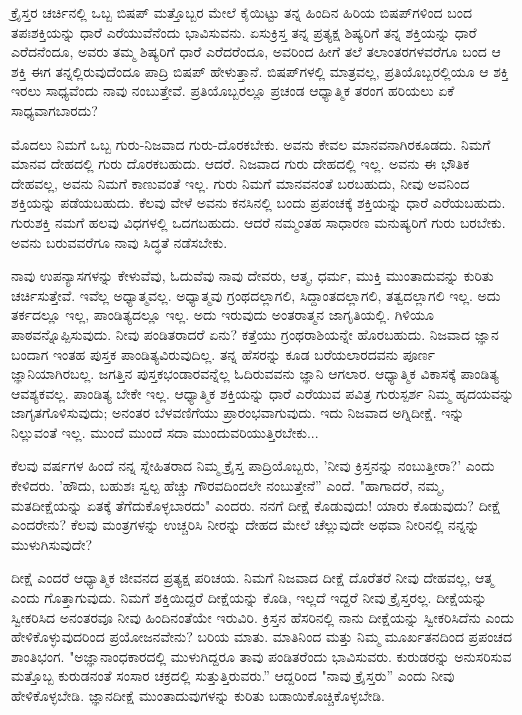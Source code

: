  ಕ್ರೈಸ್ತರ ಚರ್ಚಿನಲ್ಲಿ ಒಬ್ಬ ಬಿಷಪ್ ಮತ್ತೊಬ್ಬರ ಮೇಲೆ ಕೈಯಿಟ್ಟು ತನ್ನ ಹಿಂದಿನ ಹಿರಿಯ ಬಿಷಪ್‌ಗಳಿಂದ ಬಂದ ತಪಃಶಕ್ತಿಯನ್ನು ಧಾರೆ ಎರೆಯುವೆನೆಂದು ಭಾವಿಸುವನು. ಏಸುಕ್ರಿಸ್ತ ತನ್ನ ಪ್ರತ್ಯಕ್ಷ ಶಿಷ್ಯರಿಗೆ ತನ್ನ ಶಕ್ತಿಯನ್ನು ಧಾರೆ ಎರೆದನೆಂದೂ, ಅವರು ತಮ್ಮ ಶಿಷ್ಯರಿಗೆ ಧಾರೆ ಎರೆದರೆಂದೂ, ಅವರಿಂದ ಹೀಗೆ ತಲೆ ತಲಾಂತರಗಳವರೆಗೂ ಬಂದ ಆ ಶಕ್ತಿ ಈಗ ತನ್ನಲ್ಲಿರುವುದೆಂದೂ ಪಾದ್ರಿ ಬಿಷಪ್ ಹೇಳುತ್ತಾನೆ. ಬಿಷಪ್‌ಗಳಲ್ಲಿ ಮಾತ್ರವಲ್ಲ, ಪ್ರತಿಯೊಬ್ಬರಲ್ಲಿಯೂ ಆ ಶಕ್ತಿ ಇರಲು ಸಾಧ್ಯವೆಂದು ನಾವು ನಂಬುತ್ತೇವೆ. ಪ್ರತಿಯೊಬ್ಬರಲ್ಲೂ ಪ್ರಚಂಡ ಆಧ್ಯಾತ್ಮಿಕ ತರಂಗ ಹರಿಯಲು ಏಕೆ ಸಾಧ್ಯವಾಗಬಾರದು?

ಮೊದಲು ನಿಮಗೆ ಒಬ್ಬ ಗುರು-ನಿಜವಾದ ಗುರು-ದೊರಕಬೇಕು. ಅವನು ಕೇವಲ ಮಾನವನಾಗಿರಕೂಡದು. ನಿಮಗೆ ಮಾನವ ದೇಹದಲ್ಲಿ ಗುರು ದೊರಕಬಹುದು. ಆದರೆ. ನಿಜವಾದ ಗುರು ದೇಹದಲ್ಲಿ ಇಲ್ಲ. ಅವನು ಈ ಭೌತಿಕ ದೇಹವಲ್ಲ, ಅವನು ನಿಮಗೆ ಕಾಣುವಂತೆ ಇಲ್ಲ. ಗುರು ನಿಮಗೆ ಮಾನವನಂತೆ ಬರಬಹುದು, ನೀವು ಅವನಿಂದ ಶಕ್ತಿಯನ್ನು ಪಡೆಯಬಹುದು. ಕೆಲವು ವೇಳೆ ಅವನು ಕನಸಿನಲ್ಲಿ ಬಂದು ಪ್ರಪಂಚಕ್ಕೆ ಶಕ್ತಿಯನ್ನು ಧಾರೆ ಎರೆಯಬಹುದು. ಗುರುಶಕ್ತಿ ನಮಗೆ ಹಲವು ವಿಧಗಳಲ್ಲಿ ಒದಗಬಹುದು. ಆದರೆ ನಮ್ಮಂತಹ ಸಾಧಾರಣ ಮನುಷ್ಯರಿಗೆ ಗುರು ಬರಬೇಕು. ಅವನು ಬರುವವರೆಗೂ ನಾವು ಸಿದ್ಧತೆ ನಡೆಸಬೇಕು.

ನಾವು ಉಪನ್ಯಾಸಗಳನ್ನು ಕೇಳುವೆವು, ಓದುವೆವು ನಾವು ದೇವರು, ಆತ್ಮ, ಧರ್ಮ, ಮುಕ್ತಿ ಮುಂತಾದುವನ್ನು ಕುರಿತು ಚರ್ಚಿಸುತ್ತೇವೆ. ಇವೆಲ್ಲ ಅಧ್ಯಾತ್ಮವಲ್ಲ. ಅಧ್ಯಾತ್ಮವು ಗ್ರಂಥದಲ್ಲಾಗಲಿ, ಸಿದ್ದಾಂತದಲ್ಲಾಗಲಿ, ತತ್ವದಲ್ಲಾಗಲಿ ಇಲ್ಲ. ಅದು ತರ್ಕದಲ್ಲೂ ಇಲ್ಲ, ಪಾಂಡಿತ್ಯದಲ್ಲೂ ಇಲ್ಲ. ಅದು ಇರುವುದು ಅಂತರಾತ್ಮನ ಜಾಗೃತಿಯಲ್ಲಿ. ಗಿಳಿಯೂ ಪಾಠವನ್ನೊಪ್ಪಿಸುವುದು. ನೀವು ಪಂಡಿತರಾದರೆ ಏನು? ಕತ್ತೆಯು ಗ್ರಂಥರಾಶಿಯನ್ನೇ ಹೊರಬಹುದು. ನಿಜವಾದ ಜ್ಞಾನ ಬಂದಾಗ ಇಂತಹ ಪುಸ್ತಕ ಪಾಂಡಿತ್ಯವಿರುವುದಿಲ್ಲ. ತನ್ನ ಹೆಸರನ್ನು ಕೂಡ ಬರೆಯಲಾರದವನು ಪೂರ್ಣ ಜ್ಞಾನಿಯಾಗಿರಬಲ್ಲ. ಜಗತ್ತಿನ ಪುಸ್ತಕಭಂಡಾರವನ್ನೆಲ್ಲ ಓದಿರುವವನು ಜ್ಞಾನಿ ಆಗಲಾರ. ಆಧ್ಯಾತ್ಮಿಕ ವಿಕಾಸಕ್ಕೆ ಪಾಂಡಿತ್ಯ ಆವಶ್ಯಕವಲ್ಲ. ಪಾಂಡಿತ್ಯ ಬೇಕೇ ಇಲ್ಲ. ಆಧ್ಯಾತ್ಮಿಕ ಶಕ್ತಿಯನ್ನು ಧಾರೆ ಎರೆಯುವ ಪವಿತ್ರ ಗುರುಸ್ಪರ್ಶ ನಿಮ್ಮ ಹೃದಯವನ್ನು ಜಾಗೃತಗೊಳಿಸುವುದು; ಅನಂತರ ಬೆಳವಣಿಗೆಯು ಪ್ರಾರಂಭವಾಗುವುದು. ಇದು ನಿಜವಾದ ಅಗ್ನಿದೀಕ್ಷೆ. ಇನ್ನು ನಿಲ್ಲುವಂತೆ ಇಲ್ಲ. ಮುಂದೆ ಮುಂದೆ ಸದಾ ಮುಂದುವರಿಯುತ್ತಿರಬೇಕು...

ಕೆಲವು ವರ್ಷಗಳ ಹಿಂದೆ ನನ್ನ ಸ್ನೇಹಿತರಾದ ನಿಮ್ಮ ಕ್ರೈಸ್ತ ಪಾದ್ರಿಯೊಬ್ಬರು, 'ನೀವು ಕ್ರಿಸ್ತನನ್ನು ನಂಬುತ್ತೀರಾ?' ಎಂದು ಕೇಳಿದರು. 'ಹೌದು, ಬಹುಶಃ ಸ್ವಲ್ಪ ಹೆಚ್ಚು ಗೌರವದಿಂದಲೇ ನಂಬುತ್ತೇನೆ” ಎಂದೆ. "ಹಾಗಾದರೆ, ನಮ್ಮ, ಮತದೀಕ್ಷೆಯನ್ನು ಏತಕ್ಕೆ ತೆಗೆದುಕೊಳ್ಳಬಾರದು" ಎಂದರು. ನನಗೆ ದೀಕ್ಷೆ ಕೊಡುವುದು! ಯಾರು ಕೊಡುವುದು? ದೀಕ್ಷೆ ಎಂದರೇನು? ಕೆಲವು ಮಂತ್ರಗಳನ್ನು ಉಚ್ಚರಿಸಿ ನೀರನ್ನು ದೇಹದ ಮೇಲೆ ಚೆಲ್ಲುವುದೇ ಅಥವಾ ನೀರಿನಲ್ಲಿ ನನ್ನನ್ನು ಮುಳುಗಿಸುವುದೇ?

ದೀಕ್ಷೆ ಎಂದರೆ ಆಧ್ಯಾತ್ಮಿಕ ಜೀವನದ ಪ್ರತ್ಯಕ್ಷ ಪರಿಚಯ. ನಿಮಗೆ ನಿಜವಾದ ದೀಕ್ಷೆ ದೊರೆತರೆ ನೀವು ದೇಹವಲ್ಲ, ಆತ್ಮ ಎಂದು ಗೊತ್ತಾಗುವುದು. ನಿಮಗೆ ಶಕ್ತಿಯಿದ್ದರೆ ದೀಕ್ಷೆಯನ್ನು ಕೊಡಿ, ಇಲ್ಲದೆ ಇದ್ದರೆ ನೀವು ಕ್ರೈಸ್ತರಲ್ಲ. ದೀಕ್ಷೆಯನ್ನು ಸ್ವೀಕರಿಸಿದ ಅನಂತರವೂ ನೀವು ಹಿಂದಿನಂತೆಯೇ ಇರುವಿರಿ. ಕ್ರಿಸ್ತನ ಹೆಸರಿನಲ್ಲಿ ನಾನು ದೀಕ್ಷೆಯನ್ನು ಸ್ವೀಕರಿಸಿದೆನು ಎಂದು ಹೇಳಿಕೊಳ್ಳುವುದರಿಂದ ಪ್ರಯೋಜನವೇನು? ಬರಿಯ ಮಾತು. ಮಾತಿನಿಂದ ಮತ್ತು ನಿಮ್ಮ ಮೂರ್ಖತನದಿಂದ ಪ್ರಪಂಚದ ಶಾಂತಿಭಂಗ. "ಅಜ್ಞಾನಾಂಧಕಾರದಲ್ಲಿ ಮುಳುಗಿದ್ದರೂ ತಾವು ಪಂಡಿತರೆಂದು ಭಾವಿಸುವರು. ಕುರುಡರನ್ನು ಅನುಸರಿಸುವ ಮತ್ತೊಬ್ಬ ಕುರುಡನಂತೆ ಸಂಸಾರ ಚಕ್ರದಲ್ಲಿ ಸುತ್ತುತ್ತಿರುವರು.” ಆದ್ದರಿಂದ "ನಾವು ಕ್ರೈಸ್ತರು'' ಎಂದು ನೀವು ಹೇಳಿಕೊಳ್ಳಬೇಡಿ. ಜ್ಞಾನದೀಕ್ಷೆ ಮುಂತಾದುವುಗಳನ್ನು ಕುರಿತು ಬಡಾಯಿಕೊಚ್ಚಿಕೊಳ್ಳಬೇಡಿ.

